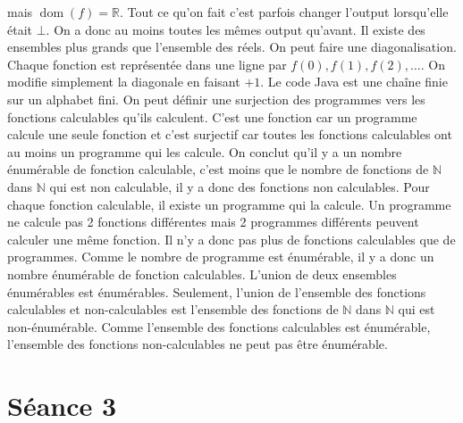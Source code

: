 \begin{mcqs}
{  mais $\mathop{\mathrm{dom}}(f) = \mathbb{R}$.}
  {Tout ce qu'on fait c'est parfois changer l'output lorsqu'elle était $\bot$. On a donc au moins toutes les mêmes output qu'avant.}
  {Il existe des ensembles plus grands que l’ensemble des réels.}
  {On peut faire une diagonalisation.
  Chaque fonction est représentée dans une ligne par $f(0),f(1),f(2),\ldots$.
  On modifie simplement la diagonale en faisant $+1$.}
  {Le code Java est une chaîne finie sur un alphabet fini.}
  {On peut définir une surjection des programmes vers les fonctions calculables qu'ils calculent.
  C'est une fonction car un programme calcule une seule fonction et c'est surjectif car toutes les fonctions calculables
  ont au moins un programme qui les calcule.
  On conclut qu'il y a un nombre énumérable de fonction calculable, c'est moins que le nombre de fonctions de $\mathbb{N}$ dans $\mathbb{N}$
  qui est non calculable, il y a donc des fonctions non calculables.}
  {Pour chaque fonction calculable, il existe un programme qui la calcule.
  Un programme ne calcule pas 2 fonctions différentes mais 2 programmes différents peuvent calculer une même fonction.
  Il n'y a donc pas plus de fonctions calculables que de programmes.
  Comme le nombre de programme est énumérable,
  il y a donc un nombre énumérable de fonction calculables.}
  {L'union de deux ensembles énumérables est énumérables.
  Seulement, l'union de l'ensemble des fonctions calculables et non-calculables
  est l'ensemble des fonctions de $\mathbb{N}$ dans $\mathbb{N}$ qui est non-énumérable.
  Comme l'ensemble des fonctions calculables est énumérable,
  l'ensemble des fonctions non-calculables ne peut pas être énumérable.}
\end{mcqs}

\section*{Séance 3}

